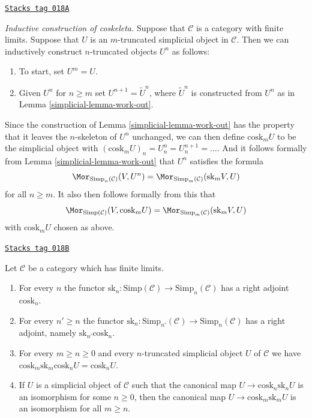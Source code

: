 \begin{remark}
\label{simplicial-remark-inductive-coskeleton}
\href{https://stacks.math.columbia.edu/tag/018A}{\texttt{Stacks tag 018A}}

{\it Inductive construction of coskeleta.}
Suppose that $\mathcal{C}$ is a category with
finite limits. Suppose that $U$ is an $m$-truncated
simplicial object in $\mathcal{C}$. Then we can
inductively construct $n$-truncated objects $U^n$ as
follows:
\begin{enumerate}
\item To start, set $U^m = U$.
\item Given $U^n$ for $n \geq m$ set $U^{n + 1} = \tilde U^n$,
where $\tilde U^n$ is constructed from $U^n$ as in Lemma
\ref{simplicial-lemma-work-out}.
\end{enumerate}
Since the construction of Lemma \ref{simplicial-lemma-work-out} has
the property that it leaves the $n$-skeleton of $U^n$
unchanged, we can then define $\text{cosk}_m U$ to be
the simplicial object with
$(\text{cosk}_m U)_n = U^n_n = U^{n + 1}_n = \ldots$.
And it follows formally from Lemma \ref{simplicial-lemma-work-out}
that $U^n$ satisfies the formula
$$
\Mor_{\text{Simp}_n(\mathcal{C})}(V, U^n)
=
\Mor_{\text{Simp}_m(\mathcal{C})}(\text{sk}_mV, U)
$$
for all $n \geq m$. It also then follows formally
from this that
$$
\Mor_{\text{Simp}(\mathcal{C})}(V, \text{cosk}_mU)
=
\Mor_{\text{Simp}_m(\mathcal{C})}(\text{sk}_mV, U)
$$
with $\text{cosk}_mU$ chosen as above.
\end{remark}

\begin{lemma}[Cosk up]
\label{simplicial-lemma-cosk-up}
\href{https://stacks.math.columbia.edu/tag/018B}{\texttt{Stacks tag 018B}}

Let $\mathcal{C}$ be a category which has finite limits.
\begin{enumerate}
\item For every $n$ the functor $\text{sk}_n : \text{Simp}(\mathcal{C})
\to \text{Simp}_n(\mathcal{C})$ has a right adjoint $\text{cosk}_n$.
\item For every $n' \geq n$ the functor
$\text{sk}_n : \text{Simp}_{n'}(\mathcal{C}) \to \text{Simp}_n(\mathcal{C})$
has a right adjoint, namely $\text{sk}_{n'}\text{cosk}_n$.
\item For every $m \geq n \geq 0$ and every $n$-truncated simplicial
object $U$ of $\mathcal{C}$ we have
$\text{cosk}_m \text{sk}_m \text{cosk}_n U = \text{cosk}_n U$.
\item If $U$ is a simplicial object of $\mathcal{C}$ such that
the canonical map
$U \to \text{cosk}_n \text{sk}_nU$
is an isomorphism for some $n \geq 0$, then the canonical map
$U \to \text{cosk}_m \text{sk}_mU$
is an isomorphism for all $m \geq n$.
\end{enumerate}
\end{lemma}

